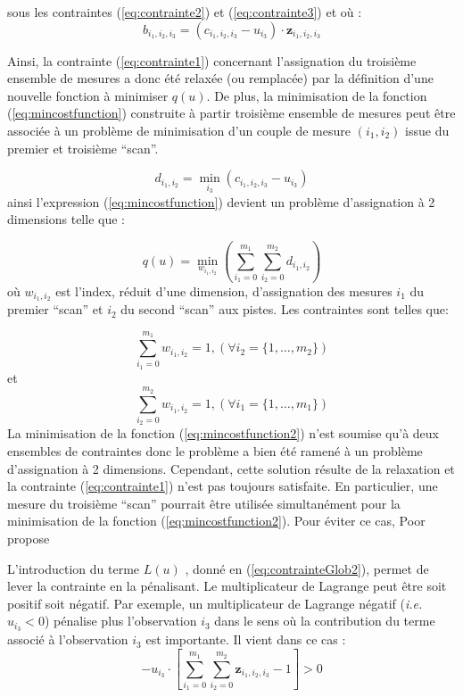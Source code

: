 \documentclass[10pt,french,a4paper]{report}
\begin{document}
sous les contraintes (\ref{eq:contrainte2}) et (\ref{eq:contrainte3}) et où :
 \begin{equation} 
b_{i_{1},i_{2},i_{3}} = (c_{i_{1},i_{2},i_{3}} -  u_{i_3} )  \cdot \mathbf{z}_{i_{1},i_{2},i_{3}} 
 \end{equation} 	
 
Ainsi, la contrainte (\ref{eq:contrainte1}) concernant l'assignation du troisième ensemble de mesures a donc été relaxée (ou
remplacée) par la définition d'une nouvelle fonction à minimiser $q(u)$. De plus, la minimisation de la fonction
(\ref{eq:mincostfunction}) construite à partir troisième ensemble de mesures peut être associée à un problème de minimisation d'un
couple de mesure  $(i_1,i_2)$  issue du premier et troisième ``scan''.

 \begin{equation} 
d_{i_{1},i_{2}} = \min_{i_3} (c_{i_{1},i_{2},i_{3}} -  u_{i_3} )  
 \end{equation} 
ainsi l'expression (\ref{eq:mincostfunction})  devient un problème d'assignation à 2 dimensions telle que :

 \begin{equation}  
\label{eq:mincostfunction2}
q(u) =  \min_{w_{i_1,i_2}} \left( \sum_{i_1=0}^{m_1}\sum_{i_2=0}^{m_2}    d_{i_{1},i_{2}} \right)
\end{equation}
où $w_{i_1,i_2}$ est l'index, réduit d'une dimension, d'assignation des mesures $i_1$ du premier ``scan'' et $i_2$ du second ``scan'' aux pistes. Les contraintes sont telles que:

\begin{equation}  
\sum_{i_1=0}^{m_1} w_{i_1,i_2} = 1, (\forall i_2 =\{1,\ldots,m_2\})
\end{equation}
et
\begin{equation}  
\sum_{i_2=0}^{m_2} w_{i_1,i_2} = 1, (\forall i_1 =\{1,\ldots,m_1\})
\end{equation}
La minimisation de la fonction (\ref{eq:mincostfunction2}) n'est soumise qu'à deux ensembles de contraintes donc le problème a bien été ramené à un problème d'assignation à 2 dimensions. Cependant, cette solution résulte de la relaxation et la contrainte (\ref{eq:contrainte1}) n'est pas toujours satisfaite. En particulier, une mesure du troisième ``scan'' pourrait être utilisée simultanément pour la minimisation de la fonction (\ref{eq:mincostfunction2}). Pour éviter ce cas, Poor propose

L'introduction du terme $L(u)$ , donné en (\ref{eq:contrainteGlob2}), permet de lever la contrainte en la pénalisant. Le multiplicateur de
Lagrange peut être soit positif soit négatif. Par exemple, un multiplicateur de Lagrange négatif (\textit{i.e.} $u_{i_3} < 0$)
pénalise plus l'observation $i_3$ dans le sens où la contribution du terme associé à l'observation $i_3$ est importante.
Il vient dans ce cas :
\begin{equation}  
-u_{i_3}\cdot \left[ \sum_{i_1=0}^{m_1}\sum_{i_2=0}^{m_2}\mathbf{z}_{i_{1},i_{2},i_{3}} -1 \right] >0  
\end{equation}
\end{document}
